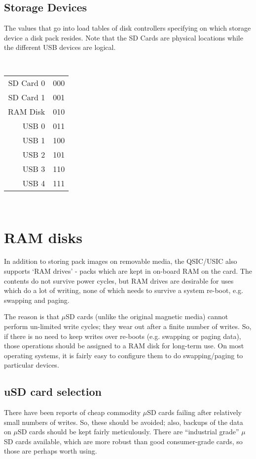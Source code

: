 \subsection{Storage Devices}
\label{storagedevice}

The values that go into load tables of disk controllers specifying on
which storage device a disk pack resides.  Note that the SD Cards are
physical locations while the different USB devices are logical.
\bigskip

{\tt
  \begin{tabular}{rl}
    SD Card 0 & 000 \\
    SD Card 1 & 001 \\
    RAM Disk & 010 \\
    USB 0 & 011 \\
    USB 1 & 100 \\
    USB 2 & 101 \\
    USB 3 & 110 \\
    USB 4 & 111 \\
\end{tabular}} \\


\section{RAM disks}

In addition to storing pack images on removable media, the QSIC/USIC also
supports `RAM drives' - packs which are kept in on-board RAM on the card. The
contents do not survive power cycles, but RAM drives are desirable for uses
which do a lot of writing, none of which needs to survive a system re-boot,
e.g. swapping and paging.

The reason is that $\mu$SD cards (unlike the original magnetic media) cannot
perform un-limited write cycles; they wear out after a finite number of
writes. So, if there is no need to keep writes over re-boots (e.g. swapping
or paging data), those operations should be assigned to a RAM disk for
long-term use. On most operating systems, it is fairly easy to configure them
to do swapping/paging to particular devices.

\subsection{uSD card selection}

There have been reports of cheap commodity $\mu$SD cards failing after relatively
small numbers of writes. So, these should be avoided; also, backups of the
data on $\mu$SD cards should be kept fairly meticulously. There are ``industrial
grade'' $\mu$SD cards available, which are more robust than good consumer-grade
cards, so those are perhaps worth using.

